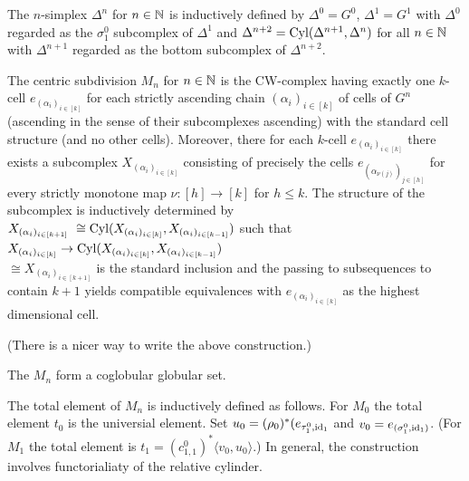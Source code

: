 The $n$-simplex $\Delta^n$ for $n \in \mathbb{N}$ is inductively defined by $\Delta^0 = G^0$, $\Delta^1 = G^1$ with $\Delta^0$ regarded as the $\sigma^0_1$ subcomplex of $\Delta^1$ and $\Delta^{n+2} = \mathrm{Cyl}(\Delta^{n+1}, \Delta^{n})$ for all $n \in \mathbb{N}$ with $\Delta^{n+1}$ regarded as the bottom subcomplex of $\Delta^{n+2}$. 

The centric subdivision $M_n$ for $n \in \mathbb{N}$ is the CW-complex having exactly one $k$-cell $e_{(\alpha_i)_{i \in [k]}}$ for each strictly ascending chain $(\alpha_i)_{i \in [k]}$ of cells of $G^n$ (ascending in the sense of their subcomplexes ascending) with the standard cell structure (and no other cells). Moreover, there for each $k$-cell $e_{(\alpha_i)_{i \in [k]}}$ there exists a subcomplex $X_{(\alpha_i)_{i \in [k]}}$ consisting of precisely the cells $e_{(\alpha_{\nu(j)})_{j \in [h]}}$ for every strictly monotone map $\nu \colon [h] \to [k]$ for $h \leq k$. The structure of the subcomplex is inductively determined by $X_{(\alpha_i)_{i \in [k + 1]}} ~\cong \mathrm{Cyl}(X_{(\alpha_i)_{i \in [k]}}, X_{(\alpha_i)_{i \in [k - 1]}})$ such that $X_{(\alpha_i)_{i \in [k]}} \to \mathrm{Cyl}(X_{(\alpha_i)_{i \in [k]}}, X_{(\alpha_i)_{i \in [k - 1]}})$ \\$\cong X_{(\alpha_i)_{i \in [k + 1]}}$ is the standard inclusion and the passing to subsequences to contain $k+1$ yields compatible equivalences with $e_{(\alpha_i)_{i \in [k]}}$ as the highest dimensional cell.

(There is a nicer way to write the above construction.)

The $M_n$ form a coglobular globular set.

The total element of $M_n$ is inductively defined as follows. For $M_0$ the total element $t_0$ is the universial element. Set $u_0 = (\rho_0)^* (e_{\tau^0_1, \mathrm{id}_1}$ and $v_0 = e_{(\sigma^0_1, \mathrm{id}_1)}$.
(For $M_1$ the total element is $t_1 = (c^0_{1,1})^* \langle v_0, u_0 \rangle$.) In general, the construction involves functorialiaty of the relative cylinder.

